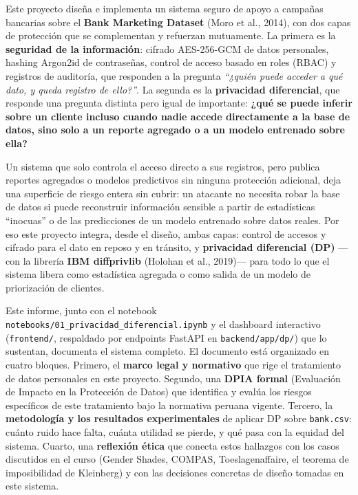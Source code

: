 \documentclass[11pt,a4paper]{article}
\begin{document}
Este proyecto diseña e implementa un sistema seguro de apoyo a campañas bancarias sobre el
\textbf{Bank Marketing Dataset} (Moro et al., 2014), con dos capas de protección que se
complementan y refuerzan mutuamente. La primera es la \textbf{seguridad de la información}:
cifrado AES-256-GCM de datos personales, hashing Argon2id de contraseñas, control de acceso
basado en roles (RBAC) y registros de auditoría, que responden a la pregunta \emph{``¿quién puede
acceder a qué dato, y queda registro de ello?''}. La segunda es la \textbf{privacidad
diferencial}, que responde una pregunta distinta pero igual de importante: \textbf{¿qué se puede
inferir sobre un cliente incluso cuando nadie accede directamente a la base de datos, sino solo a
un reporte agregado o a un modelo entrenado sobre ella?}

Un sistema que solo controla el acceso directo a sus registros, pero publica reportes agregados o
modelos predictivos sin ninguna protección adicional, deja una superficie de riesgo entera sin
cubrir: un atacante no necesita robar la base de datos si puede reconstruir información sensible a
partir de estadísticas ``inocuas'' o de las predicciones de un modelo entrenado sobre datos
reales. Por eso este proyecto integra, desde el diseño, ambas capas: control de accesos y cifrado
para el dato en reposo y en tránsito, y \textbf{privacidad diferencial (DP)} —con la librería
\textbf{IBM diffprivlib} (Holohan et al., 2019)— para todo lo que el sistema libera como
estadística agregada o como salida de un modelo de priorización de clientes.

Este informe, junto con el notebook \texttt{notebooks/01\_privacidad\_diferencial.ipynb} y el
dashboard interactivo (\texttt{frontend/}, respaldado por endpoints FastAPI en
\texttt{backend/app/dp/}) que lo sustentan, documenta el sistema completo. El documento está
organizado en cuatro bloques. Primero, el \textbf{marco legal y normativo} que rige el
tratamiento de datos personales en este proyecto. Segundo, una \textbf{DPIA formal} (Evaluación
de Impacto en la Protección de Datos) que identifica y evalúa los riesgos específicos de este
tratamiento bajo la normativa peruana vigente. Tercero, la \textbf{metodología y los resultados
experimentales} de aplicar DP sobre \texttt{bank.csv}: cuánto ruido hace falta, cuánta utilidad se
pierde, y qué pasa con la equidad del sistema. Cuarto, una \textbf{reflexión ética} que conecta
estos hallazgos con los casos discutidos en el curso (Gender Shades, COMPAS, Toeslagenaffaire, el
teorema de imposibilidad de Kleinberg) y con las decisiones concretas de diseño tomadas en este
sistema.
\end{document}
